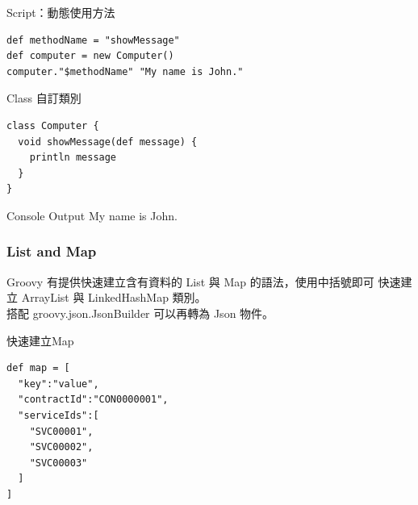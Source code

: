 \documentclass{beamer}
\begin{document}
\begin{frame}[fragile]
  \begin{block}{Script：動態使用方法}
\begin{lstlisting}
def methodName = "showMessage"
def computer = new Computer()
computer."$methodName" "My name is John."
\end{lstlisting}
  \end{block}

  \begin{block}{Class 自訂類別}
\begin{lstlisting}
class Computer {
  void showMessage(def message) {
    println message
  }
}
\end{lstlisting}
  \end{block}
  
  \begin{block}{Console Output}
    My name is John. 
  \end{block}
\end{frame}
\begin{frame}[fragile]
  \frametitle{List and Map}
  Groovy 有提供快速建立含有資料的 List 與 Map 的語法，使用中括號即可
  快速建立 ArrayList 與 LinkedHashMap 類別。~\\
  搭配 groovy.json.JsonBuilder 可以再轉為 Json 物件。
  \begin{block}{快速建立Map}
\begin{lstlisting}
def map = [
  "key":"value",
  "contractId":"CON0000001",
  "serviceIds":[
    "SVC00001",
    "SVC00002",
    "SVC00003"
  ]
]
\end{lstlisting}
  \end{block}
\end{frame}
\end{document}
